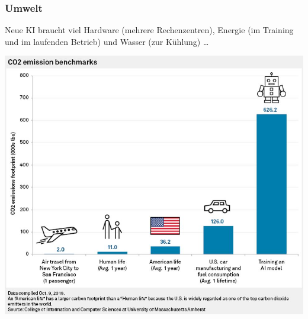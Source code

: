 \documentclass[aspectratio=169,usenames,dvipsnames]{beamer}
\begin{document}
\begin{frame}
\frametitle{Umwelt}
\begin{minipage}{0.33\textwidth}
\large Neue KI braucht viel Hardware (mehrere Rechenzentren), Energie (im Training und im laufenden Betrieb) und Wasser (zur Kühlung) \dots
\end{minipage}\hfill\begin{minipage}{0.55\textwidth}
\begin{center}
\includegraphics[width=\textwidth]{images/carbon}
\end{center}
\end{minipage}
\end{frame}
\end{document}
